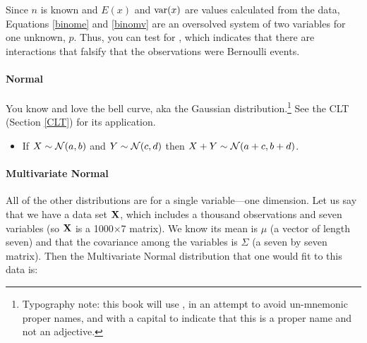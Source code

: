 Since $n$ is known and $E(x)$ and $\operatorname{var}(x)$ are values calculated from
the data, Equations \ref{binome} and \ref{binomv} are an oversolved
system of two variables for one unknown, $p$. Thus, you can test for
, which indicates that there are interactions that
falsify that the observations were  Bernoulli events.

\paragraph{Normal}

You know and love the bell curve, aka the Gaussian
distribution.\footnote{Typography note: this book will use ,
in an attempt to avoid un-mnemonic proper names, and with a capital to indicate
that this is a proper name and not an adjective.} See the CLT (Section
\ref{CLT}) for its application.


 

\begin{itemize}
\item If $X \sim {\cal N} (a,b)$ and $Y \sim {\cal N} (c,d)$ then $X+Y \sim {\cal N}
(a+c,b+d)$.
\end{itemize}

\paragraph{Multivariate Normal}
All of the other distributions are for a single variable---one
dimension. Let us say that we have a data set ${\bf X}$, which includes a
thousand observations and seven variables (so ${\bf X}$ is a 1000$\times$7
matrix). We know its mean is
$\mu$ (a vector of length seven) and that the covariance among the
variables is $\Sigma$ (a seven by seven matrix). Then the Multivariate
Normal distribution that one would fit to this data is:

